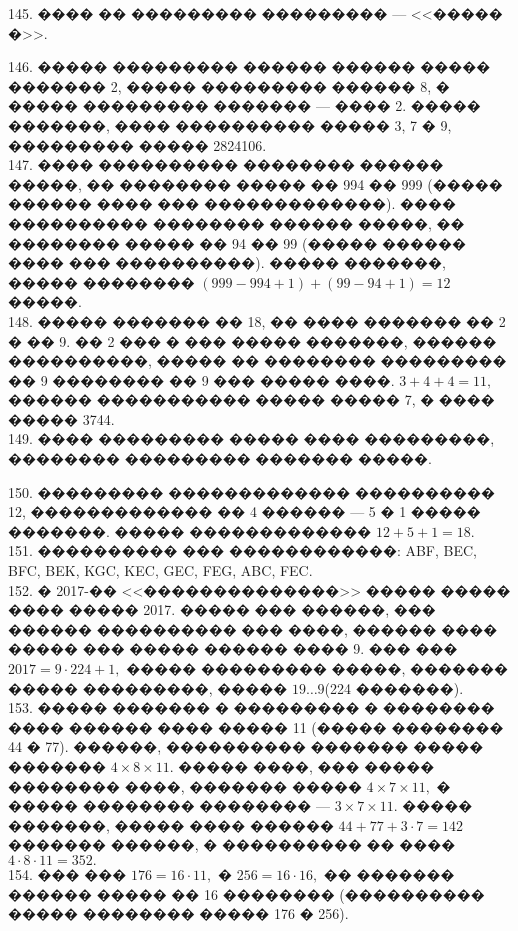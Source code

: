 \documentclass[12pt]{article}
\begin{document}
145. ���� �� ��������� ��������� --- <<����� �>>.
\begin{center}
\begin{figure}[ht!]
\end{figure}
\end{center}
146. ����� ��������� ������ ������ ����� ������� 2, ����� ��������� ������ 8, � ����� ��������� ������� --- ���� 2. ����� �������, ���� ���������� ����� 3, 7 � 9, ��������� ����� 2824106.\\
147. ���� ���������� �������� ������ �����, �� �������� ����� �� 994 �� 999 (����� ������ ���� ��� �������������). ���� ���������� �������� ������ �����, �� �������� ����� �� 94 �� 99 (����� ������ ���� ��� ����������). ����� �������, ����� �������� $(999-994+1)+(99-94+1)=12$ �����.\\
148. ����� ������� �� 18, �� ���� ������� �� 2 � �� 9. �� 2 ��� � ��� ����� �������, ������ ����������, ����� �� �������� ��������� �� 9 �������� �� 9 ��� ����� ����. $3+4+4=11,$ ������ ����������� ����� ����� 7, � ���� ����� 3744.\\
149. ���� ��������� ����� ���� ���������, �������� ��������� ������� �����.
\begin{center}
\begin{figure}[ht!]
\end{figure}
\end{center}
150. ��������� ������������� ���������� 12, ������������� �� 4 ������ --- 5 � 1 ����� �������. ����� ������������� $12+5+1=18.$\\
151. ���������� ��� ������������: ABF, BEC, BFC, BEK, KGC, KEC, GEC, FEG, ABC, FEC.\\
152. � 2017-�� <<��������������>> ����� ����� ���� ����� 2017. ����� ��� ������, ��� ������ ���������� ��� ����, ������ ���� ����� ��� ����� ������ ���� 9. ��� ���
$2017=9\cdot224+1,$ ����� ��������� �����, ������� ����� ���������, ����� $19\ldots9$(224 �������).\\
153. ����� ������� � ��������� � �������� ���� ������ ���� ����� 11 (����� �������� 44 � 77). ������, ���������� ������� ����� ������� $4\times8\times11.$ ����� ����, ��� ����� �������� ����, ������� ����� $4\times7\times11,$ � ����� �������� �������� --- $3\times7\times11.$ ����� �������, ����� ���� ������ $44+77+3\cdot7=142$ ������� ������, � ���������� �� ���� $4\cdot8\cdot11=352.$\\
154. ��� ��� $176=16\cdot11,$ � $256=16\cdot16,$ �� ������� ������ ����� �� 16 �������� (���������� ����� �������� ����� 176 � 256).\\
\end{document}
